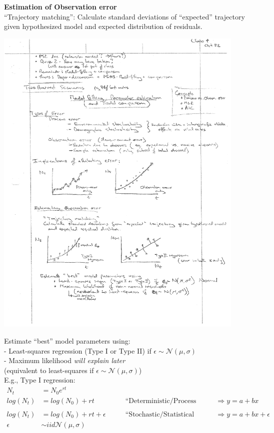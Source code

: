 \documentclass{article}
\newcommand{\ind}{\-\hspace{1cm}}
\begin{document}
\textbf{Estimation of Observation error}\\
``Trajectory matching'': 
Calculate standard deviations of ``expected'' trajectory given hypothesized model and expected distribution of residuals.

\begin{center}
	\includegraphics[width=12cm]{figs/image1.pdf}
\end{center}

Estimate ``best'' model parameters using:\\
\ind - Least-squares regression (Type I or Type II) if $\epsilon \sim \mathcal{N}(\mu, \sigma)$\\
\ind - Maximum likelihood \emph{will explain later}\\
\ind \ind \ind (equivalent to least-squares if $\epsilon \sim \mathcal{N}(\mu, \sigma)$)\\

E.g., Type I regression:\\
\begin{align*}
	N_t &= N_0 e^{rt}\\
	log(N_t) & = log(N_0)+rt \quad \quad &\text{``Deterministic/Process model''} \quad \quad  &\Rightarrow y=a + bx\\
	\\
	log(N_t) & = log(N_0)+rt+\epsilon \quad \quad &\text{``Stochastic/Statistical model''} \quad \quad &\Rightarrow y=a + bx + \epsilon \\
	\epsilon &\sim iid \mathcal{N}(\mu,\sigma)
\end{align*}
\end{document}
